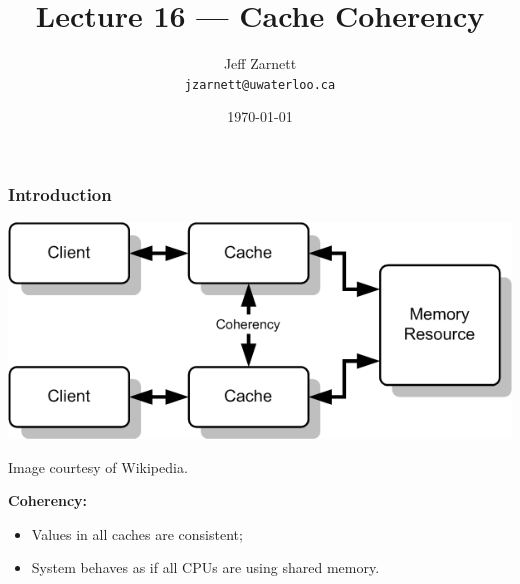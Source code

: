 

\title{Lecture 16 --- Cache Coherency }

\author{Jeff Zarnett \\ \small \texttt{jzarnett@uwaterloo.ca}}
\date{\today}




\begin{frame}
  \titlepage

 \end{frame}

\begin{frame}
  \frametitle{Introduction}

  \begin{center}
    \includegraphics[scale=0.7]{images/coherency}

    Image courtesy of Wikipedia.
  \end{center}

  
  {\bf Coherency:}
  \begin{itemize}
    \item Values in all caches are consistent;
    \item System behaves as if all CPUs are using shared memory.
  \end{itemize}
  
\end{frame}

